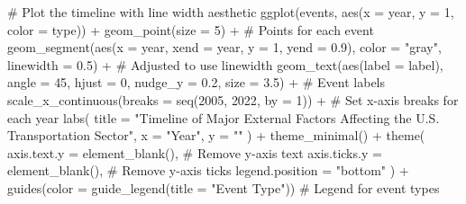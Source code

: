 \documentclass[
  letterpaper,
  DIV=11,
  numbers=noendperiod]{scrreprt}
\newenvironment{Shaded}{\begin{snugshade}}{\end{snugshade}}
\newcommand{\AttributeTok}[1]{\textcolor[rgb]{0.40,0.45,0.13}{#1}}
\newcommand{\CommentTok}[1]{\textcolor[rgb]{0.37,0.37,0.37}{#1}}
\newcommand{\DecValTok}[1]{\textcolor[rgb]{0.68,0.00,0.00}{#1}}
\newcommand{\FloatTok}[1]{\textcolor[rgb]{0.68,0.00,0.00}{#1}}
\newcommand{\FunctionTok}[1]{\textcolor[rgb]{0.28,0.35,0.67}{#1}}
\newcommand{\NormalTok}[1]{\textcolor[rgb]{0.00,0.23,0.31}{#1}}
\newcommand{\SpecialCharTok}[1]{\textcolor[rgb]{0.37,0.37,0.37}{#1}}
\newcommand{\StringTok}[1]{\textcolor[rgb]{0.13,0.47,0.30}{#1}}
\begin{document}
\begin{Shaded}
\begin{Highlighting}[]
\CommentTok{\# Plot the timeline with line width aesthetic}
\FunctionTok{ggplot}\NormalTok{(events, }\FunctionTok{aes}\NormalTok{(}\AttributeTok{x =}\NormalTok{ year, }\AttributeTok{y =} \DecValTok{1}\NormalTok{, }\AttributeTok{color =}\NormalTok{ type)) }\SpecialCharTok{+}
  \FunctionTok{geom\_point}\NormalTok{(}\AttributeTok{size =} \DecValTok{5}\NormalTok{) }\SpecialCharTok{+}  \CommentTok{\# Points for each event}
  \FunctionTok{geom\_segment}\NormalTok{(}\FunctionTok{aes}\NormalTok{(}\AttributeTok{x =}\NormalTok{ year, }\AttributeTok{xend =}\NormalTok{ year, }\AttributeTok{y =} \DecValTok{1}\NormalTok{, }\AttributeTok{yend =} \FloatTok{0.9}\NormalTok{), }\AttributeTok{color =} \StringTok{"gray"}\NormalTok{, }\AttributeTok{linewidth =} \FloatTok{0.5}\NormalTok{) }\SpecialCharTok{+}  \CommentTok{\# Adjusted to use linewidth}
  \FunctionTok{geom\_text}\NormalTok{(}\FunctionTok{aes}\NormalTok{(}\AttributeTok{label =}\NormalTok{ label), }\AttributeTok{angle =} \DecValTok{45}\NormalTok{, }\AttributeTok{hjust =} \DecValTok{0}\NormalTok{, }\AttributeTok{nudge\_y =} \FloatTok{0.2}\NormalTok{, }\AttributeTok{size =} \FloatTok{3.5}\NormalTok{) }\SpecialCharTok{+}  \CommentTok{\# Event labels}
  \FunctionTok{scale\_x\_continuous}\NormalTok{(}\AttributeTok{breaks =} \FunctionTok{seq}\NormalTok{(}\DecValTok{2005}\NormalTok{, }\DecValTok{2022}\NormalTok{, }\AttributeTok{by =} \DecValTok{1}\NormalTok{)) }\SpecialCharTok{+}  \CommentTok{\# Set x{-}axis breaks for each year}
  \FunctionTok{labs}\NormalTok{(}
    \AttributeTok{title =} \StringTok{"Timeline of Major External Factors Affecting the U.S. Transportation Sector"}\NormalTok{,}
    \AttributeTok{x =} \StringTok{"Year"}\NormalTok{,}
    \AttributeTok{y =} \StringTok{""}
\NormalTok{  ) }\SpecialCharTok{+}
  \FunctionTok{theme\_minimal}\NormalTok{() }\SpecialCharTok{+}
  \FunctionTok{theme}\NormalTok{(}
    \AttributeTok{axis.text.y =} \FunctionTok{element\_blank}\NormalTok{(),  }\CommentTok{\# Remove y{-}axis text}
    \AttributeTok{axis.ticks.y =} \FunctionTok{element\_blank}\NormalTok{(),  }\CommentTok{\# Remove y{-}axis ticks}
    \AttributeTok{legend.position =} \StringTok{"bottom"}
\NormalTok{  ) }\SpecialCharTok{+}
  \FunctionTok{guides}\NormalTok{(}\AttributeTok{color =} \FunctionTok{guide\_legend}\NormalTok{(}\AttributeTok{title =} \StringTok{"Event Type"}\NormalTok{))  }\CommentTok{\# Legend for event types}
\end{Highlighting}
\end{Shaded}
\end{document}

